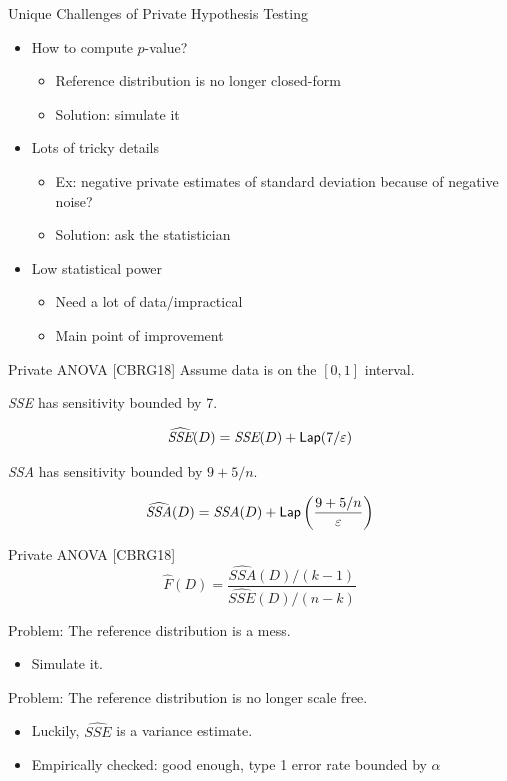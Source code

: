 \documentclass{beamer}
\newcommand{\sse}{\textit{SSE}\xspace}
\newcommand{\ssa}{\textit{SSA}\xspace}
\newcommand{\lap}{\ensuremath{{\sf Lap}}\xspace}
\begin{document}
\begin{frame}{Unique Challenges of Private Hypothesis Testing}
\begin{itemize}
    \item How to compute $p$-value? \pause
        \begin{itemize}
            \item Reference distribution is no longer closed-form \pause
            \item Solution: simulate it
        \end{itemize}
    \item Lots of tricky details \pause
        \begin{itemize}
            \item Ex: negative private estimates of standard deviation because of negative noise? \pause
            \item Solution: ask the statistician \pause
        \end{itemize}
    \item Low statistical power \pause
        \begin{itemize}
            \item Need a lot of data/impractical \pause
            \item Main point of improvement
        \end{itemize}
\end{itemize}
\end{frame}


\begin{frame}{Private ANOVA [CBRG18]}
Assume data is on the $[0,1]$ interval. \pause
\begin{theorem}
\sse has sensitivity bounded by 7.
\end{theorem}
\pause
$$\widehat{\sse}(D) = \sse(D) + \lap(7/\varepsilon) $$
\pause
\begin{theorem}
\ssa has sensitivity bounded by $9 + 5/n$.
\end{theorem}
\pause
$$\widehat{\ssa}(D) = \ssa(D) + \lap\left(\frac{9+5/n}{\varepsilon}\right) $$
\end{frame}

\begin{frame}{Private ANOVA [CBRG18]}
$$\widehat{F}(D) = \frac{\widehat{\ssa}(D)/(k-1)}{\widehat{\sse}(D)/(n-k)}$$
\bigskip

 \pause
Problem: The reference distribution is a mess. \pause
\begin{itemize}
\item Simulate it.
\end{itemize}

 \pause
Problem: The reference distribution is no longer scale free.  \pause
\begin{itemize}
\item Luckily, $\widehat{\sse}$ is a variance estimate.  \pause
\item Empirically checked: good enough, type 1 error rate bounded by $\alpha$
\end{itemize}
\end{frame}
\end{document}
